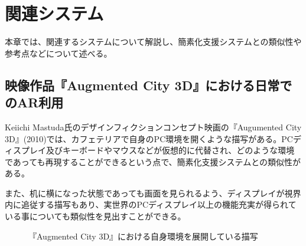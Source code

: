 
\chapter{関連システム}
\label{chap:relatedSystem}

本章では、関連するシステムについて解説し、簡素化支援システムとの類似性や参考点などについて述べる。

\newpage

\section{映像作品『Augmented City 3D』における日常でのAR利用}

Keiichi Mastuda氏のデザインフィクションコンセプト映画の『Augumented City 3D』(2010)\cite{arcity}では、カフェテリアで自身のPC環境を開くような描写がある。PCディスプレイ及びキーボードやマウスなどが仮想的に代替され、どのような環境であっても再現することができるという点で、簡素化支援システムとの類似性がある。

また、机に横になった状態であっても画面を見られるよう、ディスプレイが視界内に追従する描写もあり、実世界のPCディスプレイ以上の機能充実が得られている事についても類似性を見出すことができる。

\begin{figure}[htbp]
  \begin{minipage}{0.5\hsize}
    \begin{center}
    \end{center}
  \end{minipage}
  \begin{minipage}{0.5\hsize}
    \begin{center}
    \end{center}
  \end{minipage}
  \caption{『Augmented City 3D』における自身環境を展開している描写}
\end{figure}

